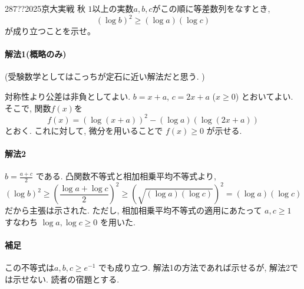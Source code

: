 \begin{prob}{287}{\hosi ??}{2025京大実戦 秋}
$1$以上の実数$a,b,c$がこの順に等差数列をなすとき,
\[
(\log{b})^2 \geq (\log{a})(\log{c})
\]
が成り立つことを示せ。
\end{prob}

\paragraph{解法1(概略のみ)}
(受験数学としてはこっちが定石に近い解法だと思う. )

対称性より公差は非負としてよい.
$b = x+a$, $c = 2x+a$ ($x \geq 0$) とおいてよい.
そこで, 関数$f(x)$を
\[
f(x) = (\log{(x+a)})^2 - (\log{a})(\log{(2x+a)})
\]
とおく. これに対して, 微分を用いることで $f(x) \geq 0$ が示せる.


\paragraph{解法2}
$b = \frac{a+c}{2}$ である. 凸関数不等式と相加相乗平均不等式より,
\[
(\log{b})^2 \geq \left(\dfrac{\log{a} + \log{c}}{2}\right)^2 \geq (\sqrt{(\log{a})(\log{c})})^2 = (\log{a})(\log{c})
\]
だから主張は示された.
ただし, 相加相乗平均不等式の適用にあたって $a, c \geq 1$ すなわち $\log{a}, \log{c} \geq 0$ を用いた.


\paragraph{補足}
この不等式は$a,b,c \geq e^{-1}$ でも成り立つ. 解法1の方法であれば示せるが, 解法2では示せない.
読者の宿題とする.
